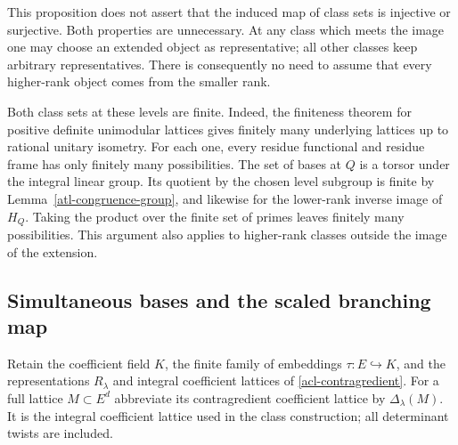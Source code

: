 This proposition does not assert that the induced map of
class sets is injective or surjective.  Both properties
are unnecessary.  At any class which meets the image one
may choose an extended object as representative; all
other classes keep arbitrary representatives.  There
is consequently no need to assume that every higher-rank
object comes from the smaller rank.

Both class sets at these levels are finite.  Indeed, the
finiteness theorem for positive definite unimodular lattices
gives finitely many underlying lattices up to rational
unitary isometry.  For each one, every residue functional
and residue frame has only finitely many possibilities.
The set of bases at $Q$ is a torsor under the integral
linear group.  Its quotient by the chosen level subgroup
is finite by Lemma~\ref{atl-congruence-group}, and likewise
for the lower-rank inverse image of $H_Q$.  Taking the
product over the finite set of primes leaves finitely
many possibilities.  This argument also applies to
higher-rank classes outside the image of the extension.

\subsection{Simultaneous bases and the scaled branching map}

Retain the coefficient field $K$, the finite family of
embeddings $\tau:E\hookrightarrow K$, and the representations
$R_\lambda$ and integral coefficient lattices of
\eqref{acl-contragredient}.  For a full lattice $M\subset E^d$
abbreviate its contragredient coefficient lattice by
$\Delta_\lambda(M)$.  It is the integral coefficient lattice used in the
class construction; all determinant twists are included.

